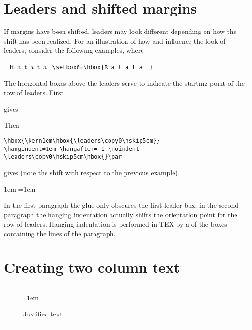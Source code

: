\section{Leaders and shifted margins}

If margins have been shifted, leaders may look different depending on how the shift has been realized.
For an illustration of how  and  influence the look of leaders, consider
the following examples, where

=\hbox{R a t a t a  }
\verb+\setbox0=\hbox{R a t a t a  }+

The horizontal boxes above the leaders serve to indicate the starting point of the row of leaders.
First




gives



Then

\begin{verbatim}
\hbox{\kern1em\hbox{\leaders\copy0\hskip5cm}}
\hangindent=1em \hangafter=-1 \noindent
\leaders\copy0\hskip5cm\hbox{}\par
\end{verbatim}

gives (note the shift with respect to the previous example)
\medskip

{\hbox{\kern1em\hbox{\leaders{}\hskip5cm}}
\hangindent=1em  \noindent
\leaders{}\hskip5cm\hbox{}\par}

In the first paragraph the  glue only obscures the first leader box; in the second paragraph
the hanging indentation actually shifts the orientation point for the row of leaders. Hanging
indentation is performed in TEX by a  of the boxes containing the lines of the
paragraph.

\vfill\eject
\section{Creating two column text}


\begin{fullwidth}
\rule{10cm}{.1pt}
\medskip
\begin{figure}
\textsf\normalsize
\hbox{\hsize 10pc \parindent 1em
\hskip 2pc
}
\caption{Justified text\hfill}
\end{figure}

\bigskip\bigskip
\rule{10cm}{.1pt}
\end{fullwidth}


